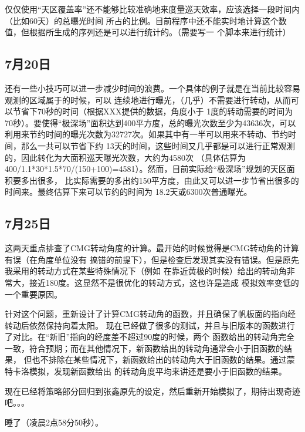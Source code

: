 仅仅使用“天区覆盖率”还不能够比较准确地来度量巡天效率，应该选择一段时间内（比如60天）的总曝光时间
所占的比例。目前程序中还不能实时地计算这个数值，但根据所生成的序列还是可以进行统计的。（需要写一
个脚本来进行统计）



\subsection{7月20日}

还有一些小技巧可以进一步减少时间的浪费。一个具体的例子就是在当前比较容易观测的区域属于的时候，可以
连续地进行曝光，（几乎）不需要进行转动，从而可以节省下70秒的时间（根据XXX提供的数据，角度小于
1度的转动需要的时间为70秒）。要使得“极深场”面积达到400平方度，总的曝光次数至少为43636次，可以
利用来节约时间的曝光次数为32727次。如果其中有一半可以用来不转动、节约时间，那么一共可以节省下约
13天的时间，这些时间又几乎都是可以进行正常观测的，因此转化为大面积巡天曝光次数，大约为4580次
（具体估算为400/1.1*30*1.5*70/(150+100)=4581）。然而，目前实际给“极深场”规划的天区面积要多出很多，
比实际需要的多出约150平方度，由此又可以进一步节省出很多的时间来。最终估算下来可以节约的时间为
18.2天或6300次普通曝光。



\subsection{7月25日}
这两天重点排查了CMG转动角度的计算。最开始的时候觉得是CMG转动角的计算有误（在角度单位没有
搞错的前提下），但是检查后发现其实没有错误。但是原先我采用的转动方式在某些特殊情况下（例如
在靠近黄极的时候）给出的转动角非常大，接近180度。这显然不是很优化的转动方式，这也许是造成
模拟效率变低的一个重要原因。

针对这个问题，重新设计了计算CMG转动角的函数，并且确保了帆板面的指向经转动后依然保持向着太阳。
现在已经做了很多的测试，并且与旧版本的函数进行了对比。在“新旧”指向的经度差不超过90度的时候，两个
函数给出的转动角完全一致，符合预期；而在其他情况下，新函数给出的转动角通常会小于旧函数的结果，
但也不排除在某些情况下，新函数给出的转动角大于旧函数的结果。通过蒙特卡洛模拟，发现新函数给出
的转动角度平均来讲还是要小于旧函数的结果。

现在已经将策略部分回归到张鑫原先的设定，然后重新开始模拟了，期待出现奇迹吧。。。

睡了（凌晨2点58分50秒）。